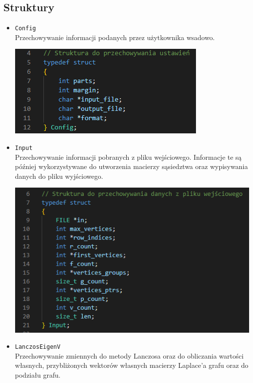 \documentclass{article}
\begin{document}
    \subsection{Struktury}
    
    \begin{itemize}
    
        \item \texttt{Config} \\
        Przechowywanie informacji podanych przez użytkownika wsadowo.
    
        \includegraphics[width=0.65\linewidth, center]{img/config.png}
    
        \item \texttt{Input} \\
        Przechowywanie informacji pobranych z pliku wejściowego. Informacje te są później wykorzystywane do utworzenia macierzy sąsiedztwa oraz wypisywania danych do pliku wyjściowego.
    
        \includegraphics[width=0.75\linewidth, center]{img/input.png}

        \item \texttt{LanczosEigenV} \\
        Przechowywanie zmiennych do metody Lanczosa oraz do obliczania wartości własnych, przybliżonych wektorów własnych macierzy Laplace'a grafu oraz do podziału grafu.
    

\end{itemize}
\end{document}
